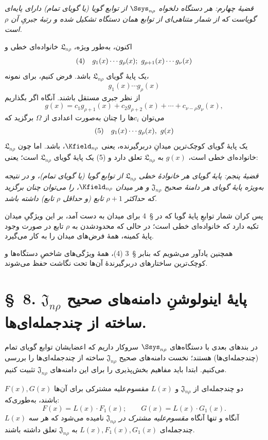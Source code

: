 \documentclass[11pt]{article}
\providecommand{\Lsys}{\mathfrak{L}}
\providecommand{\Jdom}{\mathfrak{J}}
\begin{document}
\emph{قضیهٔ چهارم: هر دستگاه دلخواه $\Ssys_{n\rho}$ از توابع گویا (یا گویای تمام) دارای پایه‌ای گویاست که از شمار متناهی‌ای از توابع همان دستگاه تشکیل شده و رتبهٔ جبریِ آن $\rho$ است.}

اکنون، به‌طور ویژه، $\Lsys_{n\rho}$ خانواده‌ای خطی و
\[
\begin{array}{@{}l@{\quad}c@{}}
(4)&g_1(x)\cdots g_\rho(x);\ g_{\rho+1}(x)\cdots g_\nu(x)
\end{array}
\]
یک پایهٔ گویای $\Lsys_{n\rho}$ باشد. فرض کنیم، برای نمونه،
\[
g_1(x)\cdots g_\rho(x)
\]
از نظر جبری مستقل باشند. آنگاه اگر بگذاریم
\[
g(x)=c_1g_{\rho+1}(x)+c_2g_{\rho+2}(x)+\cdots+c_{\nu-\rho}g_\nu(x),
\]
می‌توان $c_i$ها را چنان به‌صورت اعدادی از $\Omega$ برگزید که
\[
\begin{array}{@{}l@{\quad}c@{}}
(5)&g_1(x)\cdots g_\rho(x),\ g(x)
\end{array}
\]
یک پایهٔ گویای کوچک‌ترین میدانِ دربرگیرنده، یعنی $\Kfield_{n\rho}$، باشد. اما چون $\Lsys_{n\rho}$ خانواده‌ای خطی است، $g(x)$ به $\Lsys_{n\rho}$ تعلق دارد و (5) یک پایهٔ گویای $\Lsys_{n\rho}$ است؛ یعنی:

\emph{قضیهٔ پنجم: پایهٔ گویای هر خانوادهٔ خطی $\Lsys_{n\rho}$ از توابع گویا (یا گویای تمام)، و در نتیجه به‌ویژه پایهٔ گویای هر دامنهٔ صحیح $\Jdom_{n\rho}$ و هر میدان $\Kfield_{n\rho}$، را می‌توان چنان برگزید که حداکثر $\rho+1$ تابع (و حداقل $\rho$ تابع) داشته باشد.}

پس کران شمار توابعِ پایهٔ گویا که در \S\ 4 برای میدان به دست آمد، بر این ویژگیِ میدان تکیه دارد که خانواده‌ای خطی است؛ در حالی که محدودشدن به $\rho$ تابع در صورت وجود پایهٔ کمینه، همهٔ فرض‌های میدان را به کار می‌گیرد.

همچنین یادآور می‌شویم که بنابر \S\ 3 (4)، همهٔ ویژگی‌های شاخصِ دستگاه‌ها و کوچک‌ترین ساختارهای دربرگیرندهٔ آن‌ها تحت نگاشت حفظ می‌شوند.


\section*{\S\ 8. پایهٔ اینولوشنِ دامنه‌های صحیح $\Jdom_{n\rho}$ ساخته از چندجمله‌ای‌ها.}

در بندهای بعدی با دستگاه‌های $\Ssys_{n\rho}$ سروکار داریم که اعضایشان توابع گویای تمام (چندجمله‌ای‌ها) هستند؛ نخست دامنه‌های صحیح $\Jdom_{n\rho}$ ساخته از چندجمله‌ای‌ها را بررسی می‌کنیم. ابتدا باید مفاهیم بخش‌پذیری را برای این دامنه‌های $\Jdom_{n\rho}$ تثبیت کنیم.

$F(x),G(x)$ دو چندجمله‌ای از $\Jdom_{n\rho}$ و $L(x)$ مقسوم‌علیه مشترکی برای آن‌ها باشند، به‌طوری‌که:
\[
F(x)=L(x)\cdot F_1(x);\qquad G(x)=L(x)\cdot G_1(x).
\]
$L(x)$ آنگاه و تنها آنگاه \emph{مقسوم‌علیه مشترک در $\Jdom_{n\rho}$} نامیده می‌شود که هر سه چندجمله‌ای $L(x),F_1(x),G_1(x)$ به $\Jdom_{n\rho}$ تعلق داشته باشند.
\end{document}
